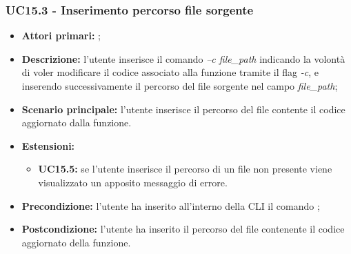 \subsubsection{UC15.3 - Inserimento percorso file sorgente}
\begin{itemize}
	\item \textbf{Attori primari:} \us{};
	\item \textbf{Descrizione:} l'utente inserisce il comando \pedit{} \textit{–c file\_path} indicando la volontà di voler modificare il codice associato alla funzione tramite il flag \textit{-c}, e inserendo successivamente il percorso del file sorgente nel campo \textit{file\_path}; 
	\item \textbf{Scenario principale:} l'utente inserisce il percorso del file contente il codice aggiornato dalla funzione. 
	\item \textbf{Estensioni:} 
	\begin{itemize}
		\item \textbf{UC15.5:} se l'utente inserisce il percorso di un file non presente viene visualizzato un apposito messaggio di errore. 
	\end{itemize}
	\item \textbf{Precondizione:} l’utente ha inserito all’interno della CLI il comando \edit{}; 
	\item \textbf{Postcondizione:} l’utente ha inserito il percorso del file contenente il codice aggiornato della funzione.
\end{itemize}